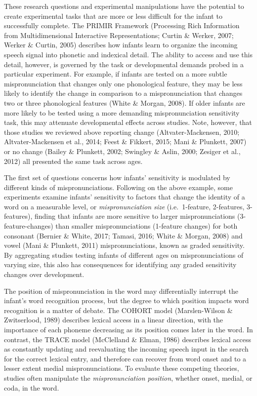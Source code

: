 \documentclass[
  english,
  man, noextraspace]{apa6}
\begin{document}
These research questions and experimental manipulations have the potential to create experimental tasks that are more or less difficult for the infant to successfully complete. The PRIMIR Framework (Processing Rich Information from Multidimensional Interactive Representations; Curtin \& Werker, 2007; Werker \& Curtin, 2005) describes how infants learn to organize the incoming speech signal into phonetic and indexical detail. The ability to access and use this detail, however, is governed by the task or developmental demands probed in a particular experiment. For example, if infants are tested on a more subtle mispronunciation that changes only one phonological feature, they may be less likely to identify the change in comparison to a mispronunciation that changes two or three phonological features (White \& Morgan, 2008). If older infants are more likely to be tested using a more demanding mispronunciation sensitivity task, this may attenuate developmental effects across studies. Note, however, that those studies we reviewed above reporting change (Altvater-Mackensen, 2010; Altvater-Mackensen et al., 2014; Feest \& Fikkert, 2015; Mani \& Plunkett, 2007) or no change (Bailey \& Plunkett, 2002; Swingley \& Aslin, 2000; Zesiger et al., 2012) all presented the same task across ages.

The first set of questions concerns how infants' sensitivity is modulated by different kinds of mispronunciations. Following on the above example, some experiments examine infants' sensitivity to factors that change the identity of a word on a measurable level, or \emph{mispronunciation size} (i.e.~1-feature, 2-features, 3-features), finding that infants are more sensitive to larger mispronunciations (3-feature-changes) than smaller mispronunciations (1-feature changes) for both consonant (Bernier \& White, 2017; Tamasi, 2016; White \& Morgan, 2008) and vowel (Mani \& Plunkett, 2011) mispronunciations, known as graded sensitivity. By aggregating studies testing infants of different ages on mispronunciations of varying size, this also has consequences for identifying any graded sensitivity changes over development.

The position of mispronunciation in the word may differentially interrupt the infant's word recognition process, but the degree to which position impacts word recognition is a matter of debate. The COHORT model (Marslen-Wilson \& Zwitserlood, 1989) describes lexical access in a linear direction, with the importance of each phoneme decreasing as its position comes later in the word. In contrast, the TRACE model (McClelland \& Elman, 1986) describes lexical access as constantly updating and reevaluating the incoming speech input in the search for the correct lexical entry, and therefore can recover from word onset and to a lesser extent medial mispronunciations. To evaluate these competing theories, studies often manipulate the \emph{mispronunciation position}, whether onset, medial, or coda, in the word.
\end{document}
